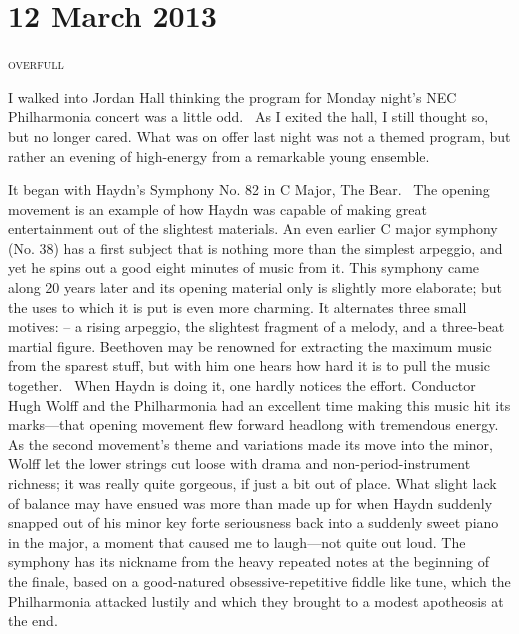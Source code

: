 \chapter{12 March 2013}

\textsc{overfull}

I walked into Jordan Hall thinking the program for Monday night’s NEC Philharmonia concert was a little odd.  As I exited the hall, I still thought so, but no longer cared. What was on offer last night was not a themed program, but rather an evening of high-energy from a remarkable young ensemble.

It began with Haydn’s Symphony No. 82 in C Major, The Bear.  The opening movement is an example of how Haydn was capable of making great entertainment out of the slightest materials. An even earlier C major symphony (No. 38) has a first subject that is nothing more than the simplest arpeggio, and yet he spins out a good eight minutes of music from it. This symphony came along 20 years later and its opening material only is slightly more elaborate; but the uses to which it is put is even more charming. It alternates three small motives: – a rising arpeggio, the slightest fragment of a melody, and a three-beat martial figure. Beethoven may be renowned for extracting the maximum music from the sparest stuff, but with him one hears how hard it is to pull the music together.  When Haydn is doing it, one hardly notices the effort. Conductor Hugh Wolff and the Philharmonia had an excellent time making this music hit its marks—that opening movement flew forward headlong with tremendous energy. As the second movement’s theme and variations made its move into the minor, Wolff let the lower strings cut loose with drama and non-period-instrument richness; it was really quite gorgeous, if just a bit out of place. What slight lack of balance may have ensued was more than made up for when Haydn suddenly snapped out of his minor key forte seriousness back into a suddenly sweet piano in the major, a moment that caused me to laugh—not quite out loud. The symphony has its nickname from the heavy repeated notes at the beginning of the finale, based on a good-natured obsessive-repetitive fiddle like tune, which the Philharmonia attacked lustily and which they brought to a modest apotheosis at the end.

